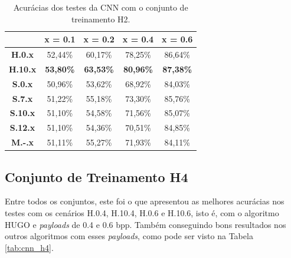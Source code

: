 \begin{table}[!htb]
\centering
\begin{tabular}{c|c|c|c|c|}
\cline{2-5}
\textbf{}                             & \textbf{x = 0.1} & \textbf{x = 0.2} & \textbf{x = 0.4} & \textbf{x = 0.6} \\ \hline
\multicolumn{1}{|c|}{\textbf{H.0.x}}  & 52,44\%          & 60,17\%          & 78,25\%          & 86,64\%          \\ \hline
\multicolumn{1}{|c|}{\textbf{H.10.x}} & \textbf{53,80\%} & \textbf{63,53\%} & \textbf{80,96\%} & \textbf{87,38\%} \\ \hline
\multicolumn{1}{|c|}{\textbf{S.0.x}}  & 50,96\%          & 53,62\%          & 68,92\%          & 84,03\%          \\ \hline
\multicolumn{1}{|c|}{\textbf{S.7.x}}  & 51,22\%          & 55,18\%          & 73,30\%          & 85,76\%          \\ \hline
\multicolumn{1}{|c|}{\textbf{S.10.x}} & 51,10\%          & 54,58\%          & 71,56\%          & 85,07\%          \\ \hline
\multicolumn{1}{|c|}{\textbf{S.12.x}} & 51,10\%          & 54,36\%          & 70,51\%          & 84,85\%          \\ \hline
\multicolumn{1}{|c|}{\textbf{M.-.x}}  & 51,11\%          & 55,27\%          & 71,93\%          & 84,11\%          \\ \hline
\end{tabular}
\caption{Acurácias dos testes da CNN com o conjunto de treinamento H2.}
\label{tab:cnn_h2}
\end{table}


\subsection{Conjunto de Treinamento H4}

Entre todos os conjuntos, este foi o que apresentou as melhores acurácias nos testes com os cenários H.0.4, H.10.4, H.0.6 e H.10.6, isto é, com o algoritmo HUGO e \textit{payloads} de 0.4 e 0.6 bpp. Também conseguindo bons resultados nos outros algoritmos com esses \textit{payloads}, como pode ser visto na Tabela \ref{tab:cnn_h4}.

